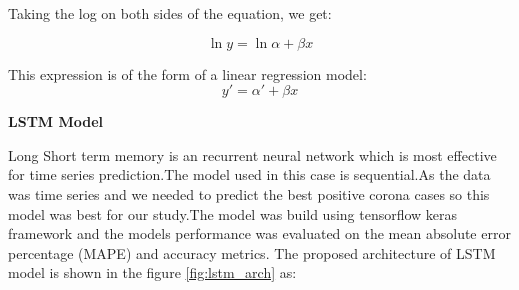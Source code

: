 Taking the log on both sides of the equation, we get:

\begin{equation}
	\ln y = \ln \alpha + \beta x
\end{equation}

This expression is of the form of a linear regression model:
\begin{equation}
	y\prime = \alpha \prime + \beta x
\end{equation}



\textbf{LSTM Model}

Long Short term memory is an recurrent neural network which is most effective for time
series prediction.The model used in this case is sequential.As the data was time series and
we needed to predict the best positive corona cases so this model was best for our study.The
model was build using tensorflow keras framework and the models performance was
evaluated on the mean absolute error percentage (MAPE) and accuracy metrics.
The proposed architecture of LSTM model is shown in the figure
\ref{fig:lstm_arch} as:

